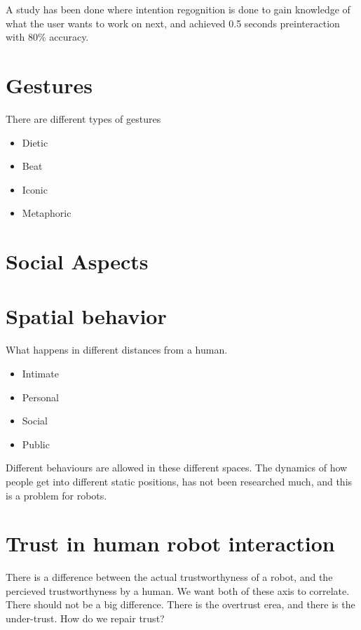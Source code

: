 \documentclass[a4paper]{article}
\begin{document}
A study has been done where intention regognition is done to gain knowledge of what the user wants to work on next, and achieved 0.5 seconds preinteraction with 80\% accuracy. 

\section{Gestures}
There are different types of gestures
\begin{itemize}
	\item Dietic
	\item Beat
	\item Iconic
	\item Metaphoric
\end{itemize}

\section{Social Aspects}


\section{Spatial behavior}
What happens in different distances from a human.
\begin{itemize}
	\item Intimate
	\item Personal 
	\item Social
	\item Public 
\end{itemize}
Different behaviours are allowed in these different spaces. 
The dynamics of how people get into different static positions, has not been researched much, and this is a problem for robots.

\section{Trust in human robot interaction}
There is a difference between the actual trustworthyness of a robot, and the percieved trustworthyness by a human. We want both of these axis to correlate. There should not be a big difference. There is the overtrust erea, and there is the under-trust. 
How do we repair trust?
\end{document}
